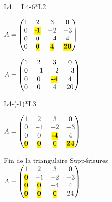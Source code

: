 \vspace{5mm} %

L4 = L4-6*L2 \\

\vspace{5mm} %

$
A =
\begin{pmatrix}
  1 & 2 & 3 & 0    \\
  0 & \hl{\textbf{-1}} & -2 & -3 \\
  0 & 0 & -4 & 4   \\
  0 & \hl{\textbf{0}} & \hl{\textbf{4}} & \hl{\textbf{20}}   \\
\end{pmatrix}
$

\vspace{5mm} %

$
A =
\begin{pmatrix}
  1 & 2 & 3 & 0    \\
  0 & -1 & -2 & -3 \\
  0 & 0 & \hl{\textbf{-4}} & 4   \\
  0 & 0 & 4 & 20  \\
\end{pmatrix}
$

\vspace{5mm} %

L4-(-1)*L3\\

\vspace{5mm} %

$
A =
\begin{pmatrix}
  1 & 2 & 3 & 0    \\
  0 & -1 & -2 & -3 \\
  0 & 0 & \hl{\textbf{-4}} & 4   \\
  \hl{\textbf{0}} & \hl{\textbf{0}} & \hl{\textbf{0}} & \hl{\textbf{24}}  \\
\end{pmatrix}
$

\vspace{5mm} %
Fin de la triangulaire Suppérieures \\

$
A =
\begin{pmatrix}
  1 & 2 & 3 & 0    \\
  \hl{\textbf{0}} & -1 & -2 & -3 \\
  \hl{\textbf{0}} & \hl{\textbf{0}} & -4 & 4   \\
  \hl{\textbf{0}} & \hl{\textbf{0}} & \hl{\textbf{0}} & 24  \\
\end{pmatrix}
$

